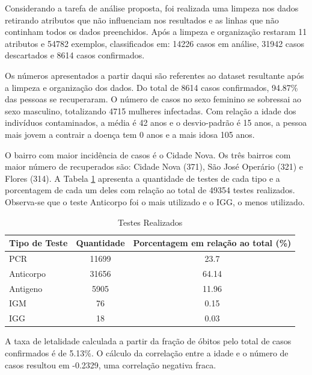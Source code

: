\documentclass[12pt]{article}
\begin{document}

Considerando a tarefa de análise proposta, foi realizada uma limpeza nos dados retirando atributos que não influenciam nos resultados e as linhas que não continham todos os dados preenchidos. Após a limpeza e organização restaram 11 atributos e 54782 exemplos, classificados em: 14226 casos em análise, 31942 casos descartados e 8614 casos confirmados.


Os números apresentados a partir daqui são referentes ao dataset resultante após a limpeza e organização dos dados. Do total de 8614 casos confirmados, 94.87\% das pessoas se recuperaram. O número de casos no sexo feminino se sobressai ao sexo masculino, totalizando 4715 mulheres infectadas. Com relação a idade dos indivíduos contaminados, a média é 42 anos e o desvio-padrão é 15 anos, a pessoa mais jovem a contrair a doença tem 0 anos e a mais idosa 105 anos.


O bairro com maior incidência de casos é o Cidade Nova. Os três bairros com maior número de recuperados são: Cidade Nova (371), São José Operário (321) e Flores (314). A Tabela \ref{tab1} apresenta a quantidade de testes de cada tipo e a porcentagem de cada um deles com relação ao total de 49354 testes realizados. Observa-se que o teste Anticorpo foi o mais utilizado e o IGG, o menos utilizado.

\begin{table}[h]\footnotesize
	\centering
	\caption{Testes Realizados}
	\begin{tabular}{|l|c|c|}
		\hline
	\textbf{Tipo de Teste}	& \textbf{Quantidade}  & \textbf{Porcentagem em relação ao total (\%)}  \\ \hline
	PCR	& 11699 & 23.7\\ \hline
	Anticorpo	& 31656  & 64.14 \\ \hline
	Antigeno	& 5905 & 11.96  \\ \hline
	IGM	& 76 & 0.15 \\ \hline
	IGG	& 18 & 0.03 \\ \hline
	\end{tabular}
	\label{tab1}
\end{table}

A taxa de letalidade calculada a partir da fração de óbitos pelo total de casos confirmados é de 5.13\%. O cálculo da correlação entre a idade e o número de casos resultou em -0.2329, uma correlação negativa fraca.
\end{document}
